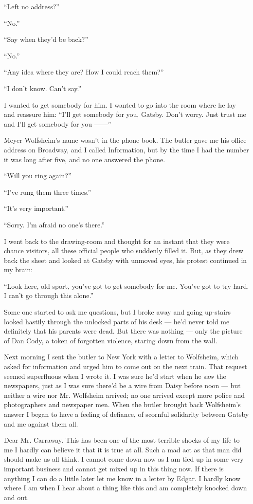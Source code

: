 \documentclass{znotebook}
\begin{document}
``Left no address?''

``No.''

``Say when they’d be back?''

``No.''

``Any idea where they are? How I could reach them?''

``I don’t know. Can’t say.''

I wanted to get somebody for him. I wanted to go into the room where he lay and reassure him: ``I’ll get somebody for you, Gatsby. Don’t worry. Just trust me and I’ll get somebody for you ——''

Meyer Wolfsheim’s name wasn’t in the phone book. The butler gave me his office address on Broadway, and I called Information, but by the time I had the number it was long after five, and no one answered the phone.

``Will you ring again?''

``I’ve rung them three times.''

``It’s very important.''

``Sorry. I’m afraid no one’s there.''

I went back to the drawing-room and thought for an instant that they were chance visitors, all these official people who suddenly filled it. But, as they drew back the sheet and looked at Gatsby with unmoved eyes, his protest continued in my brain:

``Look here, old sport, you’ve got to get somebody for me. You’ve got to try hard. I can’t go through this alone.''

Some one started to ask me questions, but I broke away and going up-stairs looked hastily through the unlocked parts of his desk — he’d never told me definitely that his parents were dead. But there was nothing — only the picture of Dan Cody, a token of forgotten violence, staring down from the wall.

Next morning I sent the butler to New York with a letter to Wolfsheim, which asked for information and urged him to come out on the next train. That request seemed superfluous when I wrote it. I was sure he’d start when he saw the newspapers, just as I was sure there’d be a wire from Daisy before noon — but neither a wire nor Mr. Wolfsheim arrived; no one arrived except more police and photographers and newspaper men. When the butler brought back Wolfsheim’s answer I began to have a feeling of defiance, of scornful solidarity between Gatsby and me against them all.

Dear Mr. Carraway. This has been one of the most terrible shocks of my life to me I hardly can believe it that it is true at all. Such a mad act as that man did should make us all think. I cannot come down now as I am tied up in some very important business and cannot get mixed up in this thing now. If there is anything I can do a little later let me know in a letter by Edgar. I hardly know where I am when I hear about a thing like this and am completely knocked down and out.
\end{document}
